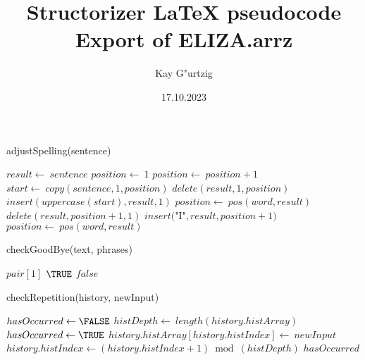 \documentclass[a4paper,10pt]{article}
\title{Structorizer LaTeX pseudocode Export of ELIZA.arrz}
\author{Kay G"urtzig}
\date{17.10.2023}
\begin{document}
\begin{algorithm}
\caption{adjustSpelling(sentence)}
\begin{algorithmic}[5]

\STATE {}
  \STATE \(result\gets\ sentence\)
  \STATE \(position\gets\ 1\)
    \STATE \(position\gets\ position+1\)
  \ENDWHILE
    \STATE \(start\gets\ copy(sentence,1,position)\)
    \STATE \(delete(result,1,position)\)
    \STATE \(insert(uppercase(start),result,1)\)
  \ENDIF
    \STATE \(position\gets\ pos(word,result)\)
      \STATE \(delete(result,position+1,1)\)
      \STATE \(insert(\)"{}I"{}\(,result,position+1)\)
      \STATE \(position\gets\ pos(word,result)\)
    \ENDWHILE
  \ENDFOR

\end{algorithmic}
\end{algorithm}


\begin{algorithm}
\caption{checkGoodBye(text, phrases)}
\begin{algorithmic}[5]

\STATE {}
\STATE {}
\STATE {}
\STATE {}
      \PRINT\(pair[1]\)
      \RETURN\(\TRUE\)
    \ENDIF
  \ENDFOR
  \RETURN\(false\)

\end{algorithmic}
\end{algorithm}


\begin{algorithm}
\caption{checkRepetition(history, newInput)}
\begin{algorithmic}[5]

\STATE {}
\STATE {}
  \STATE \(hasOccurred\gets\FALSE\)
    \STATE \(histDepth\gets\ length(history.histArray)\)
        \STATE \(hasOccurred\gets\TRUE\)
      \ENDIF
    \ENDFOR
    \STATE \(history.histArray[history.histIndex]\gets\ newInput\)
    \STATE \(history.histIndex\gets(history.histIndex+1)\bmod(histDepth)\)
  \ENDIF
  \RETURN\(hasOccurred\)

\end{algorithmic}
\end{algorithm}
\end{document}
